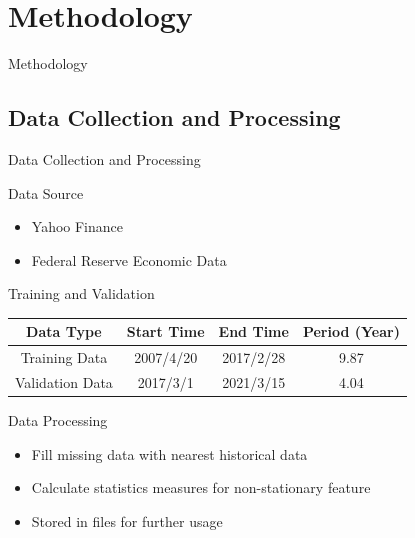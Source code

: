 \section{Methodology}
\begin{frame}{Methodology}
       \tableofcontents[sectionstyle=show/hide, hideothersubsections]
\end{frame}

\subsection{Data Collection and Processing}
\begin{frame}{Data Collection and Processing}
\begin{block}{Data Source}
\begin{itemize}
    \item Yahoo Finance
    \item Federal Reserve Economic Data
\end{itemize}
\end{block}
\begin{block}{Training and Validation}
    \centering
    \begin{tabular}{c | c| c | c}
        Data Type & Start Time & End Time & Period (Year) \\ \hline 
        Training Data  &  2007/4/20 & 2017/2/28 & 9.87\\ 
        Validation Data & 2017/3/1 & 2021/3/15 & 4.04 \\ 
        \end{tabular}
\end{block}
\begin{block}{Data Processing}
\begin{itemize}
    \item Fill missing data with nearest historical data
    \item Calculate statistics measures for non-stationary feature
    \item Stored in files for further usage
\end{itemize}
\end{block}
\end{frame}

